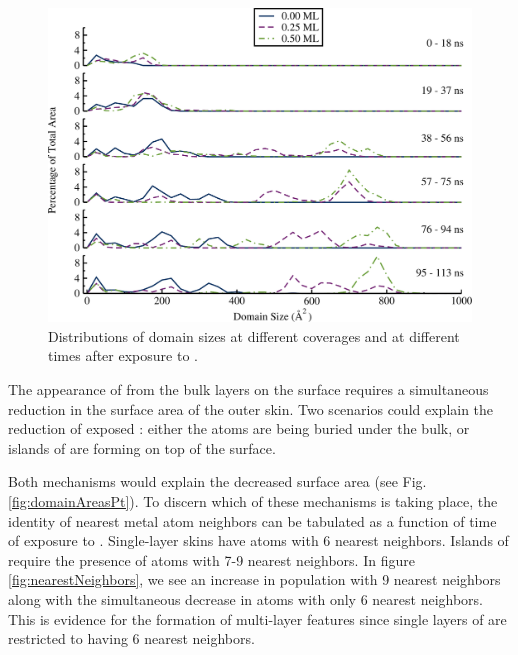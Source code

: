 \begin{figure}
\includegraphics[width=\linewidth]{../figures/chap3/domains_Pd_110ns.pdf}
\caption{Distributions of  domain sizes at different 
  coverages and at different times after exposure to .}
\label{fig:domainAreasPd} 
\end{figure}

The appearance of  from the bulk layers on the surface requires
a simultaneous reduction in the surface area of the outer 
skin. Two scenarios could explain the reduction of exposed :
either the  atoms are being buried under the  bulk, or
islands of  are forming on top of the  surface.

Both mechanisms would explain the decreased  surface area (see
Fig.  \ref{fig:domainAreasPt}).  To discern which of these mechanisms
is taking place, the identity of nearest metal atom neighbors can be
tabulated as a function of time of exposure to . Single-layer
 skins have atoms with 6  nearest neighbors. Islands of
 require the presence of  atoms with 7-9  nearest
neighbors. In figure \ref{fig:nearestNeighbors}, we see an increase in
 population with 9  nearest neighbors along with the
simultaneous decrease in  atoms with only 6  nearest
neighbors.  This is evidence for the formation of multi-layer 
features since single layers of  are restricted to having 6
 nearest neighbors.

